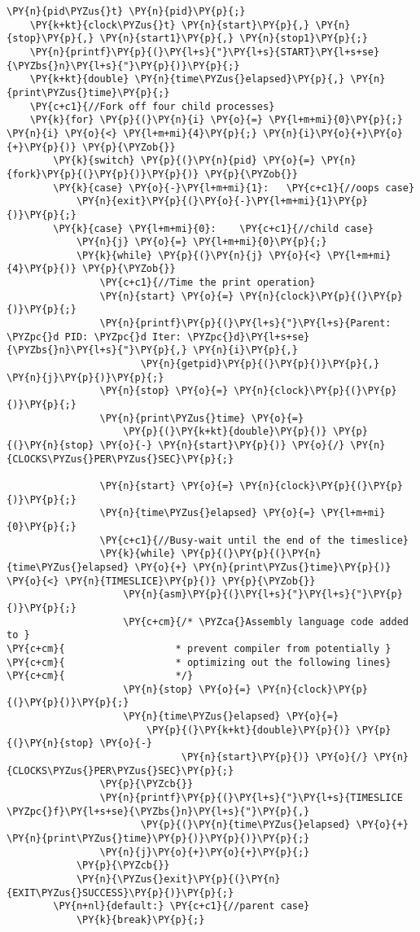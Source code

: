 \begin{Verbatim}[commandchars=\\\{\}]
	\PY{n}{pid\PYZus{}t} \PY{n}{pid}\PY{p}{;}
	\PY{k+kt}{clock\PYZus{}t} \PY{n}{start}\PY{p}{,} \PY{n}{stop}\PY{p}{,} \PY{n}{start1}\PY{p}{,} \PY{n}{stop1}\PY{p}{;}
	\PY{n}{printf}\PY{p}{(}\PY{l+s}{"}\PY{l+s}{START}\PY{l+s+se}{\PYZbs{}n}\PY{l+s}{"}\PY{p}{)}\PY{p}{;}
	\PY{k+kt}{double} \PY{n}{time\PYZus{}elapsed}\PY{p}{,} \PY{n}{print\PYZus{}time}\PY{p}{;}
	\PY{c+c1}{//Fork off four child processes}
	\PY{k}{for} \PY{p}{(}\PY{n}{i} \PY{o}{=} \PY{l+m+mi}{0}\PY{p}{;} \PY{n}{i} \PY{o}{<} \PY{l+m+mi}{4}\PY{p}{;} \PY{n}{i}\PY{o}{+}\PY{o}{+}\PY{p}{)} \PY{p}{\PYZob{}}
		\PY{k}{switch} \PY{p}{(}\PY{n}{pid} \PY{o}{=} \PY{n}{fork}\PY{p}{(}\PY{p}{)}\PY{p}{)} \PY{p}{\PYZob{}}
		\PY{k}{case} \PY{o}{-}\PY{l+m+mi}{1}:	\PY{c+c1}{//oops case}
			\PY{n}{exit}\PY{p}{(}\PY{o}{-}\PY{l+m+mi}{1}\PY{p}{)}\PY{p}{;}
		\PY{k}{case} \PY{l+m+mi}{0}:	\PY{c+c1}{//child case}
			\PY{n}{j} \PY{o}{=} \PY{l+m+mi}{0}\PY{p}{;}
			\PY{k}{while} \PY{p}{(}\PY{n}{j} \PY{o}{<} \PY{l+m+mi}{4}\PY{p}{)} \PY{p}{\PYZob{}}
				\PY{c+c1}{//Time the print operation}
				\PY{n}{start} \PY{o}{=} \PY{n}{clock}\PY{p}{(}\PY{p}{)}\PY{p}{;}
				\PY{n}{printf}\PY{p}{(}\PY{l+s}{"}\PY{l+s}{Parent: \PYZpc{}d PID: \PYZpc{}d Iter: \PYZpc{}d}\PY{l+s+se}{\PYZbs{}n}\PY{l+s}{"}\PY{p}{,} \PY{n}{i}\PY{p}{,}
				       \PY{n}{getpid}\PY{p}{(}\PY{p}{)}\PY{p}{,} \PY{n}{j}\PY{p}{)}\PY{p}{;}
				\PY{n}{stop} \PY{o}{=} \PY{n}{clock}\PY{p}{(}\PY{p}{)}\PY{p}{;}
				\PY{n}{print\PYZus{}time} \PY{o}{=}
				    \PY{p}{(}\PY{k+kt}{double}\PY{p}{)} \PY{p}{(}\PY{n}{stop} \PY{o}{-} \PY{n}{start}\PY{p}{)} \PY{o}{/} \PY{n}{CLOCKS\PYZus{}PER\PYZus{}SEC}\PY{p}{;}

				\PY{n}{start} \PY{o}{=} \PY{n}{clock}\PY{p}{(}\PY{p}{)}\PY{p}{;}
				\PY{n}{time\PYZus{}elapsed} \PY{o}{=} \PY{l+m+mi}{0}\PY{p}{;}
				\PY{c+c1}{//Busy-wait until the end of the timeslice}
				\PY{k}{while} \PY{p}{(}\PY{p}{(}\PY{n}{time\PYZus{}elapsed} \PY{o}{+} \PY{n}{print\PYZus{}time}\PY{p}{)} \PY{o}{<} \PY{n}{TIMESLICE}\PY{p}{)} \PY{p}{\PYZob{}}
					\PY{n}{asm}\PY{p}{(}\PY{l+s}{"}\PY{l+s}{"}\PY{p}{)}\PY{p}{;}
					\PY{c+cm}{/* \PYZca{}Assembly language code added to }
\PY{c+cm}{					 * prevent compiler from potentially }
\PY{c+cm}{					 * optimizing out the following lines}
\PY{c+cm}{					 */}
					\PY{n}{stop} \PY{o}{=} \PY{n}{clock}\PY{p}{(}\PY{p}{)}\PY{p}{;}
					\PY{n}{time\PYZus{}elapsed} \PY{o}{=}
					    \PY{p}{(}\PY{k+kt}{double}\PY{p}{)} \PY{p}{(}\PY{n}{stop} \PY{o}{-}
						      \PY{n}{start}\PY{p}{)} \PY{o}{/} \PY{n}{CLOCKS\PYZus{}PER\PYZus{}SEC}\PY{p}{;}
				\PY{p}{\PYZcb{}}
				\PY{n}{printf}\PY{p}{(}\PY{l+s}{"}\PY{l+s}{TIMESLICE \PYZpc{}f}\PY{l+s+se}{\PYZbs{}n}\PY{l+s}{"}\PY{p}{,}
				       \PY{p}{(}\PY{n}{time\PYZus{}elapsed} \PY{o}{+} \PY{n}{print\PYZus{}time}\PY{p}{)}\PY{p}{)}\PY{p}{;}
				\PY{n}{j}\PY{o}{+}\PY{o}{+}\PY{p}{;}
			\PY{p}{\PYZcb{}}
			\PY{n}{\PYZus{}exit}\PY{p}{(}\PY{n}{EXIT\PYZus{}SUCCESS}\PY{p}{)}\PY{p}{;}
		\PY{n+nl}{default:}	\PY{c+c1}{//parent case}
			\PY{k}{break}\PY{p}{;}


\end{Verbatim}
